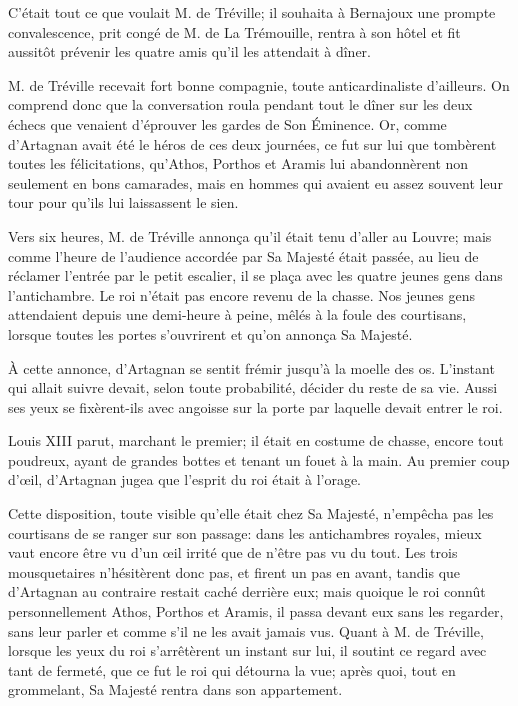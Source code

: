 C'était tout ce que voulait M. de Tréville; il souhaita à Bernajoux une prompte convalescence, prit congé de M. de La Trémouille, rentra à son hôtel et fit aussitôt prévenir les quatre amis qu'il les attendait à dîner. 

M. de Tréville recevait fort bonne compagnie, toute anticardinaliste d'ailleurs. On comprend donc que la conversation roula pendant tout le dîner sur les deux échecs que venaient d'éprouver les gardes de Son Éminence. Or, comme d'Artagnan avait été le héros de ces deux journées, ce fut sur lui que tombèrent toutes les félicitations, qu'Athos, Porthos et Aramis lui abandonnèrent non seulement en bons camarades, mais en hommes qui avaient eu assez souvent leur tour pour qu'ils lui laissassent le sien. 

Vers six heures, M. de Tréville annonça qu'il était tenu d'aller au Louvre; mais comme l'heure de l'audience accordée par Sa Majesté était passée, au lieu de réclamer l'entrée par le petit escalier, il se plaça avec les quatre jeunes gens dans l'antichambre. Le roi n'était pas encore revenu de la chasse. Nos jeunes gens attendaient depuis une demi-heure à peine, mêlés à la foule des courtisans, lorsque toutes les portes s'ouvrirent et qu'on annonça Sa Majesté. 

À cette annonce, d'Artagnan se sentit frémir jusqu'à la moelle des os. L'instant qui allait suivre devait, selon toute probabilité, décider du reste de sa vie. Aussi ses yeux se fixèrent-ils avec angoisse sur la porte par laquelle devait entrer le roi. 

Louis XIII parut, marchant le premier; il était en costume de chasse, encore tout poudreux, ayant de grandes bottes et tenant un fouet à la main. Au premier coup d'œil, d'Artagnan jugea que l'esprit du roi était à l'orage. 

Cette disposition, toute visible qu'elle était chez Sa Majesté, n'empêcha pas les courtisans de se ranger sur son passage: dans les antichambres royales, mieux vaut encore être vu d'un œil irrité que de n'être pas vu du tout. Les trois mousquetaires n'hésitèrent donc pas, et firent un pas en avant, tandis que d'Artagnan au contraire restait caché derrière eux; mais quoique le roi connût personnellement Athos, Porthos et Aramis, il passa devant eux sans les regarder, sans leur parler et comme s'il ne les avait jamais vus. Quant à M. de Tréville, lorsque les yeux du roi s'arrêtèrent un instant sur lui, il soutint ce regard avec tant de fermeté, que ce fut le roi qui détourna la vue; après quoi, tout en grommelant, Sa Majesté rentra dans son appartement. 

